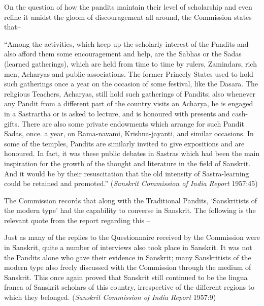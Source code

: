 On the question of how the pandits maintain their level of scholarship and even refine it amidst the gloom of discouragement all around, the Commission states that– 
\begin{myquote}
\eleven
“Among the activities, which keep up the scholarly interest of the Pandits and also afford them some encouragement and help, are the Sabhas or the Sadas (learned gatherings), which are held from time to time by rulers, Zamindars, rich men, Acharyas and public associations. The former Princely States used to hold such gatherings once a year on the occasion of some festival, like the Dasara. The religious Teachers, Acharyas, still hold such gatherings of Pandits; also whenever any Pandit from a different part of the country visits an Acharya, he is engaged in a Sastrartha or is asked to lecture, and is honoured with presents and cash-gifts. There are also some private endowments which arrange for such Pandit Sadas, once. a year, on Rama-navami, Krishna-jayanti, and similar occasions. In some of the temples, Pandits are similarly invited to give expositions and are honoured. In fact, it was these public debates in Sastras which had been the main inspiration for the growth of the thought and literature in the field of Sanskrit. And it would be by their resuscitation that the old intensity of Sastra-learning could be retained and promoted.” \hfill ({\sl Sanskrit Commission of India Report} 1957:45)
\end{myquote}

The Commission records that along with the Traditional Pandits, ‘Sanskritists of the modern type’ had the capability to converse in Sanskrit. The following is the relevant quote from the report regarding this – 
\begin{myquote}
\eleven
 Just as many of the replies to the Questionnaire received by the Commission were in Sanskrit, quite a number of interviews also took place in Sanskrit. It was not the Pandits alone who gave their evidence in Sanskrit; many Sanskritists of the modern type also freely discussed with the Commission through the medium of Sanskrit. This once again proved that Sanskrit still continued to be the lingua franca of Sanskrit scholars of this country, irrespective of the different regions to which they belonged. \hfill({\sl Sanskrit Commission of India Report} 1957:9)
\end{myquote}

